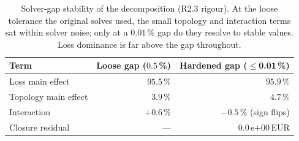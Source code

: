 \begin{table}[t]
\centering
\caption{Solver-gap stability of the decomposition (R2.3 rigour). At the loose tolerance the
original solves used, the small topology and interaction terms sat within solver noise; only at a
$0.01$\,\% gap do they resolve to stable values. Loss dominance is far above the gap throughout.}
\label{tab:gapstability}
\begin{tabular}{lrr}
\hline
Term & Loose gap ($0.5$\,\%) & Hardened gap ($\le$0.01\,\%) \\
\hline
Loss main effect & $95.5$\,\% & $95.9$\,\% \\
Topology main effect & $3.9$\,\% & $4.7$\,\% \\
Interaction & $+0.6$\,\% & $-0.5$\,\% (sign flips) \\
Closure residual & --- & $0.0$\,e${+}00$\,EUR \\
\hline
\end{tabular}
\end{table}
